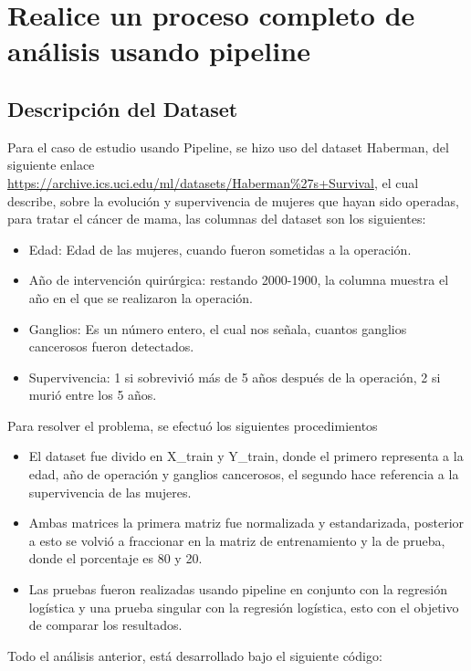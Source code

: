 
\section{\fontsize{14}{0}\selectfont Realice un proceso completo de análisis usando pipeline}
\subsection{ Descripción del Dataset}
Para el caso de estudio usando Pipeline, se hizo uso del dataset Haberman, del siguiente enlace \url{https://archive.ics.uci.edu/ml/datasets/Haberman\%27s+Survival}, el cual describe, sobre la evolución y supervivencia de mujeres que hayan sido operadas, para tratar el cáncer de mama, las columnas del dataset son los siguientes: 
\begin{itemize}
	\item Edad: Edad de las mujeres, cuando fueron sometidas a la operación. 
	\item Año de intervención quirúrgica: restando 2000-1900, la columna muestra el año en el que se realizaron la operación. 
	\item Ganglios: Es un número entero, el cual nos señala, cuantos ganglios cancerosos fueron detectados.
	\item Supervivencia: 1 si sobrevivió más de 5 años después de la operación, 2 si murió entre los 5 años.  
\end{itemize}
Para resolver el problema, se efectuó los siguientes procedimientos 
\begin{itemize}
	\item El dataset fue divido en X\_train y Y\_train, donde el primero representa a la edad, año de operación y ganglios cancerosos, el segundo hace referencia a la supervivencia de las mujeres.
	\item Ambas matrices la primera matriz fue normalizada y estandarizada, posterior a esto se volvió a fraccionar en la matriz de entrenamiento y la de prueba, donde el porcentaje es 80 y 20.
	\item Las pruebas fueron realizadas usando pipeline en conjunto con la regresión logística y una prueba singular con la regresión logística, esto con el objetivo de comparar los resultados.

	
\end{itemize}
Todo el análisis anterior, está desarrollado bajo el siguiente código:

